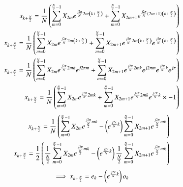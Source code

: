 \documentclass[journal,12pt,twocolumn]{IEEEtran}
\begin{document}
\begin{align}
     x_{k+\frac{N}{2}} = \frac{1}{N} \left( \sum _{m=0}^{\frac{N}{2}-1}X_{2m}e^{\frac{j2\pi}{N}2m\left(k+\frac{N}{2}\right)} + \sum _{m=0}^{\frac{N}{2}-1}X_{2m+1}e^{\frac{j2\pi}{N}(2m+1)\left(k+\frac{N}{2}\right)}\right)
     \\
     x_{k+\frac{N}{2}} = \frac{1}{N} \left(\sum _{m=0}^{\frac{N}{2}-1}X_{2m}e^{\frac{j2\pi}{N}2m\left(k+\frac{N}{2}\right)} + \sum _{m=0}^{\frac{N}{2}-1}X_{2m+1}e^{\frac{j2\pi}{N}2m\left(k+\frac{N}{2}\right)} e^{\frac{j2\pi}{N}\left(k+\frac{N}{2}\right)}\right)
     \\
     x_{k+\frac{N}{2}} = \frac{1}{N} \left(\sum _{m=0}^{\frac{N}{2}-1}X_{2m}e^{\frac{j2\pi}{N}2mk}e^{j2\pi m} + \sum _{m=0}^{\frac{N}{2}-1}X_{2m+1}e^{\frac{j2\pi}{N}2mk}e^{j2\pi m} e^{\frac{j2\pi}{N}k}e^{j\pi}\right)
     \\
     x_{k+\frac{N}{2}} = \frac{1}{N} \left(\sum _{m=0}^{\frac{N}{2}-1}X_{2m}e^{\frac{j2\pi}{N}2mk} + \sum _{m=0}^{\frac{N}{2}-1}X_{2m+1}e^{\frac{j2\pi}{N}2mk}e^{\frac{j2\pi}{N}k}\times -1\right)
\end{align}
\begin{align}
x_{k+\frac{N}{2}} = \frac{1}{N} \left(\sum _{m=0}^{\frac{N}{2}-1}X_{2m}e^{\frac{j2\pi}{\frac{N}{2}}mk} - \left( e^{\frac{j2\pi}{N}k}\right)\sum _{m=0}^{\frac{N}{2}-1}X_{2m+1}e^{\frac{j2\pi}{\frac{N}{2}}mk}\right)
\\
x_{k+\frac{N}{2}} = \frac{1}{2} \left(\frac{1}{\frac{N}{2}}\sum _{m=0}^{\frac{N}{2}-1}X_{2m}e^{\frac{j2\pi}{\frac{N}{2}}mk} - \left( e^{\frac{j2\pi}{N}k}\right) \frac{1}{\frac{N}{2}} \sum _{m=0}^{\frac{N}{2}-1}X_{2m+1}e^{\frac{j2\pi}{\frac{N}{2}}mk}\right)
\end{align}
\begin{align}
\implies x_{k+\frac{N}{2}} = e_{k} - \left( e^{\frac{j2\pi}{N}k}\right)o_{k}
\end{align}
\end{document}
